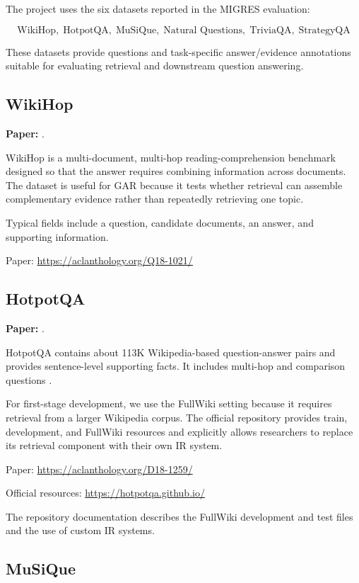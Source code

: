 \documentclass[11pt,a4paper]{article}
\begin{document}
The project uses the six datasets reported in the MIGRES evaluation:

\[
\boxed{
\text{WikiHop},\;
\text{HotpotQA},\;
\text{MuSiQue},\;
\text{Natural Questions},\;
\text{TriviaQA},\;
\text{StrategyQA}
}
\]

These datasets provide questions and task-specific answer/evidence annotations suitable for evaluating retrieval and downstream question answering.

\subsection{WikiHop}

\textbf{Paper:} \citet{welbl-etal-2018-constructing}.

WikiHop is a multi-document, multi-hop reading-comprehension benchmark designed so that the answer requires combining information across documents. The dataset is useful for GAR because it tests whether retrieval can assemble complementary evidence rather than repeatedly retrieving one topic.

Typical fields include a question, candidate documents, an answer, and supporting information.

Paper:
\url{https://aclanthology.org/Q18-1021/}

\subsection{HotpotQA}

\textbf{Paper:} \citet{yang-etal-2018-hotpotqa}.

HotpotQA contains about 113K Wikipedia-based question-answer pairs and provides sentence-level supporting facts. It includes multi-hop and comparison questions \citep{yang-etal-2018-hotpotqa}.

For first-stage development, we use the FullWiki setting because it requires retrieval from a larger Wikipedia corpus. The official repository provides train, development, and FullWiki resources and explicitly allows researchers to replace its retrieval component with their own IR system.

Paper:
\url{https://aclanthology.org/D18-1259/}

Official resources:
\url{https://hotpotqa.github.io/}

The repository documentation describes the FullWiki development and test files and the use of custom IR systems.

\subsection{MuSiQue}
\end{document}
